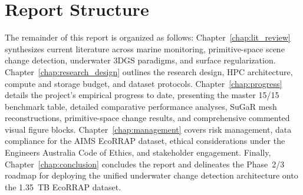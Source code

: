 \section{Report Structure}
\label{sec:report_structure}
The remainder of this report is organized as follows:
Chapter~\ref{chap:lit_review} synthesizes current literature across marine monitoring, primitive-space scene change detection, underwater 3DGS paradigms, and surface regularization. Chapter~\ref{chap:research_design} outlines the research design, HPC architecture, compute and storage budget, and dataset protocols. Chapter~\ref{chap:progress} details the project's empirical progress to date, presenting the master 15/15 benchmark table, detailed comparative performance analyses, SuGaR mesh reconstructions, primitive-space change results, and comprehensive commented visual figure blocks. Chapter~\ref{chap:management} covers risk management, data compliance for the AIMS EcoRRAP dataset, ethical considerations under the Engineers Australia Code of Ethics, and stakeholder engagement. Finally, Chapter~\ref{chap:conclusion} concludes the report and delineates the Phase~2/3 roadmap for deploying the unified underwater change detection architecture onto the 1.35~TB EcoRRAP dataset.